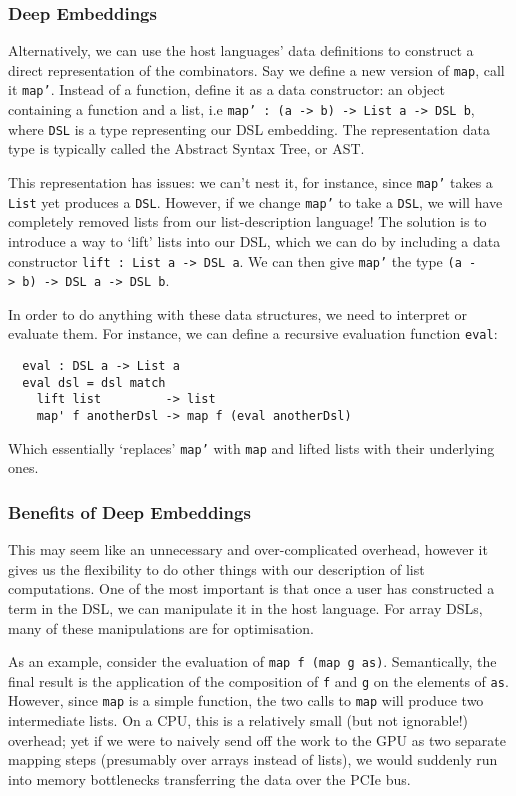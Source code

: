 \documentclass[a4paper,12pt]{article}
\newcommand{\icf}[1]{\mbox{\texttt{#1}}}
\begin{document}
\subsubsection*{Deep Embeddings} 
Alternatively, we can use the host languages' data definitions to construct a direct representation of the combinators. 
Say we define a new version of \icf{map}, call it \icf{map'}.
Instead of a function, define it as a data constructor: an object containing a function and a list, i.e \texttt{map'\ :\ (a\ ->\ b)\ ->\ List\ a\ ->\ DSL\ b}, where \icf{DSL} is a type representing our DSL embedding. 
The representation data type is typically called the Abstract Syntax Tree, or AST.

This representation has issues: we can't nest it, for instance, since \icf{map'} takes a \icf{List} yet produces a \icf{DSL}. 
However, if we change \icf{map'} to take a \icf{DSL}, we will have completely removed lists from our list-description language! 
The solution is to introduce a way to `lift' lists into our DSL, which we can do by  including a data constructor \texttt{lift\ :\ List\ a\ ->\ DSL\ a}. 
We can then give \icf{map'} the type \icf{(a\ ->\ b)\ ->\ DSL\ a\ ->\ DSL\ b}.

In order to do anything with these data structures, we need to interpret or evaluate them. 
For instance, we can define a recursive evaluation function \icf{eval}:

\begin{verbatim}
  eval : DSL a -> List a
  eval dsl = dsl match
    lift list         -> list
    map' f anotherDsl -> map f (eval anotherDsl)
\end{verbatim}

Which essentially `replaces' \icf{map'} with \icf{map} and lifted lists with their underlying ones.

\subsubsection*{Benefits of Deep Embeddings}
This may seem like an unnecessary and over-complicated overhead, however it gives us the flexibility to do other things with our description of list computations. 
One of the most important is that once a user has constructed a term in the DSL, we can manipulate it in the host language. 
For array DSLs, many of these manipulations are for optimisation.

As an example, consider the evaluation of \icf{map\ f\ (map\ g\ as)}. 
Semantically, the final result is the application of the composition of \icf{f} and \icf{g} on the elements of \icf{as}. 
However, since \icf{map} is a simple function, the two calls to \icf{map} will produce two intermediate lists. 
On a CPU, this is a relatively small (but not ignorable!) overhead; yet if we were to naively send off the work to the GPU as two separate mapping steps (presumably over arrays instead of lists), we would suddenly run into memory bottlenecks transferring the data over the PCIe bus.
\end{document}
